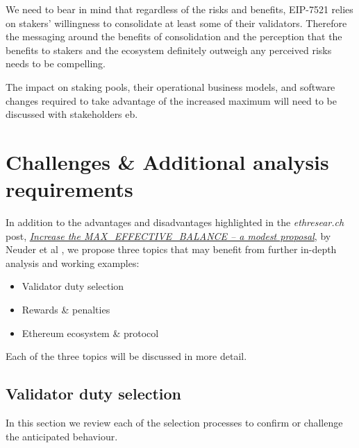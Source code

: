 \documentclass[UTF8]{article}
\begin{document}
We need to bear in mind that regardless of the risks and benefits, EIP-7521 relies on stakers' willingness to consolidate at least some of their validators. Therefore the messaging around the benefits of consolidation and the perception that the benefits to stakers and the ecosystem definitely outweigh any perceived risks needs to be compelling.

The impact on staking pools, their operational business models, and software changes required to take advantage of the increased maximum will need to be discussed with stakeholders \gls{eb}.

\clearpage
\section{Challenges \& Additional analysis requirements}
\label{sec:challenges}
In addition to the advantages and disadvantages highlighted in the \textit{ethresear.ch} post, \href{https://ethresear.ch/t/increase-the-max-effective-balance-a-modest-proposal/15801/3}{\textit{Increase the MAX\_EFFECTIVE\_BALANCE – a modest proposal}}, by  Neuder et al  \cite{Neuder2023a}, we propose three topics that may benefit from further in-depth analysis and working examples:

\begin{itemize}
\item Validator duty selection
\item Rewards \& penalties
\item Ethereum ecosystem \& protocol
\end{itemize}

Each of the three topics will be discussed in more detail. 

\subsection{Validator duty selection}
In this section we review each of the selection processes to confirm or challenge the anticipated behaviour.
\end{document}

